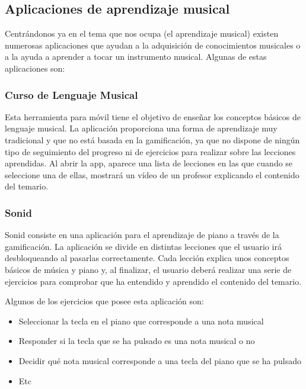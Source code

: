 

    \subsection{Aplicaciones de aprendizaje musical}
    Centrándonos ya en el tema que nos ocupa (el aprendizaje musical) existen numerosas aplicaciones que ayudan a la adquisición
    de conocimientos musicales o a la ayuda a aprender a tocar un instrumento musical. Algunas de estas aplicaciones son:

    \subsubsection{Curso de Lenguaje Musical}
    Esta herramienta para móvil tiene el objetivo de enseñar los conceptos básicos de lenguaje musical. La aplicación proporciona una forma de aprendizaje muy 
    tradicional y que no está basada en la gamificación, ya que no dispone de ningún tipo de seguimiento del progreso ni de ejercicios para realizar sobre las lecciones aprendidas.
    Al abrir la app, aparece una lista de lecciones en las que cuando se seleccione una de ellas, mostrará un vídeo de un profesor explicando el contenido del temario. 

    \subsubsection{Sonid}
    Sonid consiste en una aplicación para el aprendizaje de piano a través de la gamificación.
    La aplicación se divide en distintas lecciones que el usuario irá desbloqueando al pasarlas correctamente.
    Cada lección explica unos conceptos básicos de música y piano y, al finalizar, el usuario deberá realizar una serie
    de ejercicios para comprobar que ha entendido y aprendido el contenido del temario.

    Algunos de los ejercicios que posee esta aplicación son:
    \begin{itemize}
        \item Seleccionar la tecla en el piano que corresponde a una nota musical
        \item Responder si la tecla que se ha pulsado es una nota musical o no
        \item Decidir qué nota musical corresponde a una tecla del piano que se ha pulsado
        \item Etc 
    \end{itemize}

